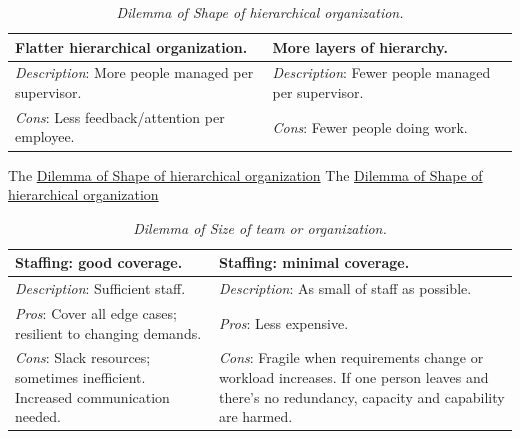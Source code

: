 \begin{center}
\begin{table}[H] %
\begin{tabular}{ | m{\dilemmatablewidth}| m{\dilemmatablewidth} | } 
  \hline
  \textbf{Flatter hierarchical organization.} &
  \textbf{More layers of hierarchy.} \\ 
  \hline
  \textit{Description}: More people managed per supervisor. & 
  \textit{Description}: Fewer people managed per supervisor. \\ 
  \hline
  \textit{Cons}: Less feedback/attention per employee. & 
  \textit{Cons}: Fewer people doing work. \\  
  \hline
\end{tabular}
\caption{
\textit{Dilemma of Shape of hierarchical organization.}
}
\label{table:people-per-supervisor}
\end{table}
\end{center}


The \href{table:people-per-supervisor}{Dilemma of Shape of hierarchical organization}
The \href{table:people-per-supervisor}{Dilemma of Shape of hierarchical organization}


\begin{center}
\begin{table}[H] %
\begin{tabular}{ | m{\dilemmatablewidth}| m{\dilemmatablewidth} | } 
  \hline
  \textbf{Staffing: good coverage.} &
  \textbf{Staffing: minimal coverage.} \\
  \hline
  \textit{Description}: Sufficient staff. &
  \textit{Description}: As small of staff as possible. \\  
  \hline
  \textit{Pros}: Cover all edge cases; resilient to changing demands. &
  \textit{Pros}: Less expensive. \\
  \hline
  \textit{Cons}: Slack resources; sometimes inefficient. Increased communication needed. & 
  \textit{Cons}: Fragile when requirements change or workload increases. If one person leaves and there's no redundancy, capacity and capability are harmed.  \\
  \hline
\end{tabular}
\caption{
\textit{Dilemma of Size of team or organization.}
}
\label{table:staff_many-vs-few}
\end{table}
\end{center}


